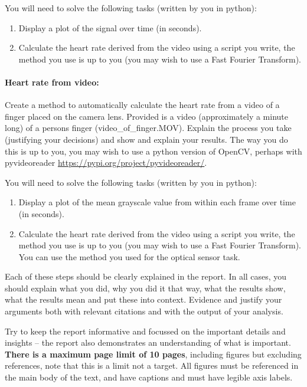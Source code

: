 \documentclass[a4paper,11pt]{article}
\begin{document}
You will need to solve the following tasks (written by you in python):
\begin{enumerate}
\item Display a plot of the signal over time (in seconds).
\item Calculate the heart rate derived from the video using a script you write, the method you use is up to you (you may wish to use a Fast Fourier Transform).
\end{enumerate}


\paragraph{Heart rate from video:}
Create a method to automatically calculate the heart rate from a video of a finger placed on the camera lens. 
Provided is a video (approximately a minute long) of a persons finger (video\_of\_finger.MOV). Explain the process you take (justifying your decisions) and show and explain your results. The way you do this is up to you, you may wish to use a python version of OpenCV, perhaps with pyvideoreader \url{https://pypi.org/project/pyvideoreader/}.

You will need to solve the following tasks (written by you in python):
\begin{enumerate}
\item Display a plot of the mean grayscale value from within each frame over time (in seconds).
\item Calculate the heart rate derived from the video using a script you write, the method you use is up to you (you may wish to use a Fast Fourier Transform). You can use the method you used for the optical sensor task.
\end{enumerate}


Each of these steps should be clearly explained in the report. 
In all cases, you should explain what you did, why you did it that way, what the results show, what the results mean and put these into context. Evidence and justify your arguments both with relevant citations and with the output of your analysis.

Try to keep the report informative and focussed on the important details and insights -- the report also demonstrates an understanding of what is important. 
\textbf{There is a maximum page limit of 10 pages}, including figures but excluding references, note that this is a limit not a target. All figures must be referenced in the main body of the text, and have captions and must have legible axis labels.
\end{document}
